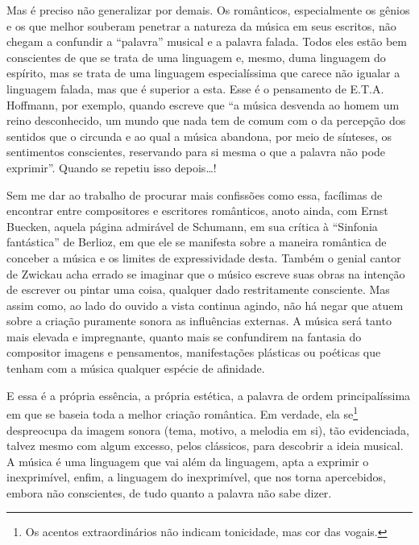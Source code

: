Mas é preciso não generalizar por demais. Os românticos, especialmente
os gênios e os que melhor souberam penetrar a natureza da música em seus
escritos, não chegam a confundir a ``palavra'' musical e a palavra
falada. Todos eles estão bem conscientes de que se trata de uma
linguagem e, mesmo, duma linguagem do espírito, mas se trata de uma
linguagem especialíssima que carece não igualar a linguagem falada, mas
que é superior a esta. Esse é o pensamento de E.T.A. Hoffmann, por
exemplo, quando escreve que ``a música desvenda ao homem um reino
desconhecido, um mundo que nada tem de comum com o da percepção dos
sentidos que o circunda e ao qual a música abandona, por meio de
sínteses, os sentimentos conscientes, reservando para si mesma o que a
palavra não pode exprimir''. Quando se repetiu isso depois\ldots{}!

Sem me dar ao trabalho de procurar mais confissões como essa, facílimas
de encontrar entre compositores e escritores românticos, anoto ainda,
com Ernst Buecken, aquela página admirável de Schumann, em sua crítica à
``Sinfonia fantástica'' de Berlioz, em que ele se manifesta sobre a
maneira romântica de conceber a música e os limites de expressividade
desta. Também o genial cantor de Zwickau acha errado se imaginar que o
músico escreve suas obras na intenção de escrever ou pintar uma coisa,
qualquer dado restritamente consciente. Mas assim como, ao lado do
ouvido a vista continua agindo, não há negar que atuem sobre a criação
puramente sonora as influências externas. A música será tanto mais
elevada e impregnante, quanto mais se confundirem na fantasia do
compositor imagens e pensamentos, manifestações plásticas ou poéticas
que tenham com a música qualquer espécie de afinidade.

E essa é a própria essência, a própria estética, a palavra de ordem
principalíssima em que se baseia toda a melhor criação romântica. Em
verdade, ela se\footnote{Os acentos extraordinários não indicam tonicidade, mas cor das
vogais.} despreocupa da imagem sonora (tema, motivo, a melodia
em si), tão evidenciada, talvez mesmo com algum excesso, pelos
clássicos, para descobrir a ideia musical. A música é uma linguagem que
vai além da linguagem, apta a exprimir o inexprimível, enfim, a
linguagem do inexprimível, que nos torna apercebidos, embora não
conscientes, de tudo quanto a palavra não sabe dizer.

